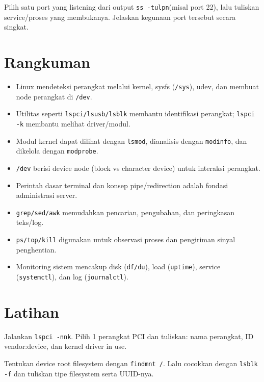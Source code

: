 \begin{exercisebox}[2.5]
Pilih satu port yang listening dari output \texttt{ss -tulpn}(misal port 22), lalu tuliskan service/proses yang membukanya. Jelaskan kegunaan port tersebut secara singkat.
\end{exercisebox}

\section{Rangkuman}
\begin{itemize}
    \item Linux mendeteksi perangkat melalui kernel, sysfs (\texttt{/sys}), udev, dan membuat node perangkat di \texttt{/dev}.
    \item Utilitas seperti \texttt{lspci/lsusb/lsblk} membantu identifikasi perangkat; \texttt{lspci -k} membantu melihat driver/modul.
    \item Modul kernel dapat dilihat dengan \texttt{lsmod}, dianalisis dengan \texttt{modinfo}, dan dikelola dengan \texttt{modprobe}.
    \item \texttt{/dev} berisi device node (block vs character device) untuk interaksi perangkat.
    \item Perintah dasar terminal dan konsep pipe/redirection adalah fondasi administrasi server.
    \item \texttt{grep/sed/awk} memudahkan pencarian, pengubahan, dan peringkasan teks/log.
    \item \texttt{ps/top/kill} digunakan untuk observasi proses dan pengiriman sinyal penghentian.
    \item Monitoring sistem mencakup disk (\texttt{df/du}), load (\texttt{uptime}), service (\texttt{systemctl}), dan log (\texttt{journalctl}).
\end{itemize}

\section{Latihan}

\begin{exercisebox}[2.A]
Jalankan \texttt{lspci -nnk}. Pilih 1 perangkat PCI dan tuliskan: nama perangkat, ID vendor:device, dan kernel driver in use.
\end{exercisebox}

\begin{exercisebox}[2.B]
Tentukan device root filesystem dengan \texttt{findmnt /}. Lalu cocokkan dengan \texttt{lsblk -f} dan tuliskan tipe filesystem serta UUID-nya.
\end{exercisebox}

